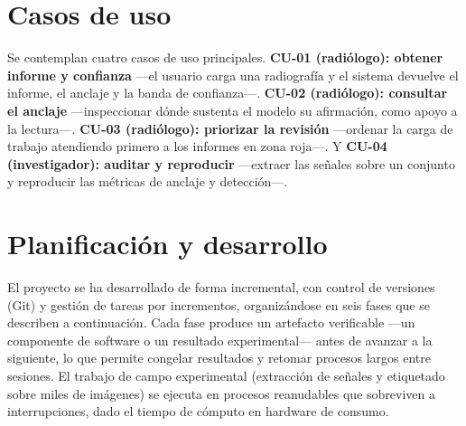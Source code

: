 \section{Casos de uso}
Se contemplan cuatro casos de uso principales. \textbf{CU-01 (radiólogo): obtener informe y confianza}
—el usuario carga una radiografía y el sistema devuelve el informe, el anclaje y la banda de
confianza—. \textbf{CU-02 (radiólogo): consultar el anclaje} —inspeccionar dónde sustenta el modelo su
afirmación, como apoyo a la lectura—. \textbf{CU-03 (radiólogo): priorizar la revisión} —ordenar la
carga de trabajo atendiendo primero a los informes en zona roja—. Y \textbf{CU-04 (investigador):
auditar y reproducir} —extraer las señales sobre un conjunto y reproducir las métricas de anclaje y
detección—.

\section{Planificación y desarrollo}
El proyecto se ha desarrollado de forma incremental, con control de versiones (Git) y gestión de
tareas por incrementos, organizándose en seis fases que se describen a continuación. Cada fase produce
un artefacto verificable —un componente de software o un resultado experimental— antes de avanzar a la
siguiente, lo que permite congelar resultados y retomar procesos largos entre sesiones. El trabajo de
campo experimental (extracción de señales y etiquetado sobre miles de imágenes) se ejecuta en procesos
reanudables que sobreviven a interrupciones, dado el tiempo de cómputo en hardware de consumo.


